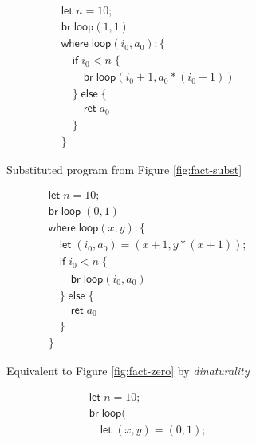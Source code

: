 \documentclass[acmsmall,screen,review]{acmart}
\newcommand{\ms}[1]{\ensuremath{\mathsf{#1}}}
\begin{document}
\begin{figure}
  \begin{minipage}{.5\textwidth}
    \begin{subfigure}{\textwidth}
      \begin{align*}
        & \ms{let}\;n = 10; \\
        & \ms{br}\;\ms{loop}(1, 1) \\
        & \ms{where}\;\ms{loop}(i_0, a_0): \{\\
        & \quad \ms{if}\;i_0 < n\;\{ \\
        & \qquad \ms{br}\;\ms{loop}(i_0 + 1, a_0 * (i_0 + 1)) \\
        & \quad \}\;\ms{else}\;\{ \\
        & \qquad \ms{ret}\;a_0 \\
        & \quad \} \\
        & \}
      \end{align*}
      \caption{Substituted program from Figure \ref{fig:fact-subst}}
      \label{fig:fact-subst-2}
    \end{subfigure}
    \begin{subfigure}{\textwidth}
      \begin{align*}
        & \ms{let}\;n = 10; \\
        & \ms{br}\;\ms{loop}\;(0, 1) \\
        & \ms{where}\;\ms{loop}(x, y): \{\\
        & \quad \ms{let}\;(i_0, a_0) = (x + 1, y * (x + 1)); \\
        & \quad \ms{if}\;i_0 < n\;\{ \\
        & \qquad \ms{br}\;\ms{loop}(i_0, a_0) \\
        & \quad \}\;\ms{else}\;\{ \\
        & \qquad \ms{ret}\;a_0 \\
        & \quad \} \\
        & \}
      \end{align*}
      \caption{Equivalent to Figure \ref{fig:fact-zero} by \textit{dinaturality}}
      \label{fig:fact-dinat}
    \end{subfigure}
  \end{minipage}%
  \begin{subfigure}[c]{.5\textwidth}
    \begin{align*}
      & \ms{let}\;n = 10; \\
      & \ms{br}\;\ms{loop}( \\
      & \quad \ms{let}\;(x, y) = (0, 1); \\

\end{align*}
\end{subfigure}
\end{figure}
\end{document}
